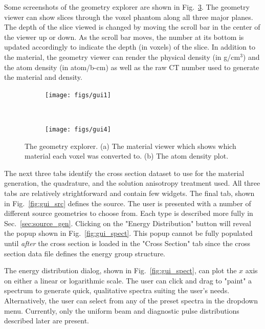 Some screenshots of the geometry explorer are shown in Fig.~\ref{fig:gui_geom}. The geometry viewer can show slices through the voxel phantom along all three major planes. The depth of the slice viewed is changed by moving the scroll bar in the center of the viewer up or down. As the scroll bar moves, the number at its bottom is updated accordingly to indicate the depth (in voxels) of the slice. In addition to the material, the geometry viewer can render the physical density (in g/cm$^3$) and the atom density (in atom/b-cm) as well as the raw CT number used to generate the material and density.

\begin{figure}
    \centering
    \begin{subfigure}[b]{0.45\textwidth}
        \texttt{[image: figs/gui1]}
        \caption{}
        \label{fig:gui1}
    \end{subfigure}
    ~
    \begin{subfigure}[b]{0.45\textwidth}
        \texttt{[image: figs/gui4]}
        \caption{}
        \label{fig:gui4}
    \end{subfigure}
    \caption{The geometry explorer. (a) The material viewer which shows which material each voxel was converted to. (b) The atom density plot.}\label{fig:gui_geom}
\end{figure}

The next three tabs identify the cross section dataset to use for the material generation, the quadrature, and the solution anisotropy treatment used. All three tabs are relatively strightforward and contain few widgets. The final tab, shown in Fig.~\ref{fig:gui_src} defines the source. The user is presented with a number of different source geometries to choose from. Each type is described more fully in Sec.~\ref{sec:source_gen}. Clicking on the "Energy Distribution" button will reveal the popup shown in Fig.~\ref{fig:gui_spect}. This popup cannot be fully populated until \textit{after} the cross section is loaded in the "Cross Section" tab since the cross section data file defines the energy group structure.

The energy distribution dialog, shown in Fig.~\ref{fig:gui_spect}, can plot the $x$ axis on either a linear or logarithmic scale. The user can click and drag to "paint" a spectrum to generate quick, qualitative spectra suiting the user's needs. Alternatively, the user can select from any of the preset spectra in the dropdown menu. Currently, only the uniform beam and diagnostic pulse distributions described later are present.

